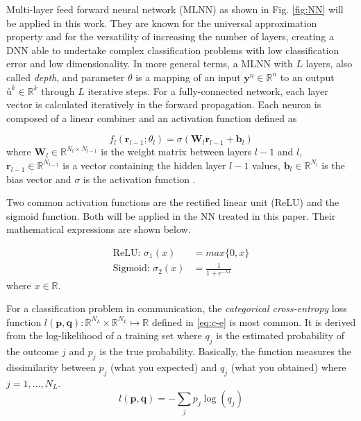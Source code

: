 \documentclass[conference]{IEEEtran}
\begin{document}
Multi-layer feed forward neural network (MLNN) as shown in Fig. \ref{fig:NN} will be applied in this work. They are known for the universal approximation property \cite{b9} and for the versatility of increasing the number of layers, creating a DNN able to undertake complex classification problems with low classification error and low dimensionality. In more general terms, a MLNN with $L$ layers, also called \textit{depth}, and parameter $\theta$ is a mapping of an input $\textbf{y}^n \in \mathbb{R}^{n}$ to an output $\textbf{û}^k \in \mathbb{R}^{k}$ through $L$ iterative steps. For a fully-connected network, each layer vector is calculated iteratively in the forward propagation. Each neuron is composed of a linear combiner and an activation function defined as 

\begin{equation}\label{eq:eqFP}
	f_{l}\left( \textbf{r}_{l-1};\theta _{l}\right) = \sigma \left( \textbf{W}_{l}\textbf{r}_{l-1}+\textbf{b}_{l}\right)
\end{equation}
where $\textbf{W}_{l}\in \mathbb{R} ^{N_{l}\times N_{l-1}}$ is the weight matrix between layers $l-1$ and $l$, $\textbf{r}_{l-1} \in \mathbb{R} ^{N_{l-1}}$ is a vector containing the hidden layer $l-1$ values, $\textbf{b}_{l}\in \mathbb{R} ^{N_l}$ is the bias vector and $\sigma$ is the activation function \cite{b2}.

%
Two common activation functions are the rectified linear unit (ReLU) and the sigmoid function. Both will be applied in the NN treated in this paper. Their mathematical expressions are shown below.

\begin{align}
	\text{ReLU: } \sigma_1 (x)& = max\{0, x\} \label{eq:relu}\\ 
	\text{Sigmoid: } \sigma_2 (x)& = \frac{1}{1+e^{- \lambda x}} \label{eq:sig}
\end{align}
where $x \in \mathbb{R}$.

For a classification problem in communication, the \textit{categorical cross-entropy} loss function $l(\textbf{p},\textbf{q}):\mathbb{R} ^{N_L}\times \mathbb{R} ^{N_L}\mapsto \mathbb{R}$ defined in \eqref{eq:c-e} is most common. It is derived from the log-likelihood of a training set where $q_j$ is the estimated probability of the outcome $j$ and $p_{j}$ is the true probability. Basically, the function measures the dissimilarity between $p_{j}$ (what you expected) and $q_{j}$ (what you obtained) \cite{b10} where $j=1,...,N_L$.
\begin{equation}\label{eq:c-e}
	l(\textbf{p},\textbf{q})=-\sum _{j}p_{j}\log \left( q_{j}\right)
\end{equation}
\end{document}

